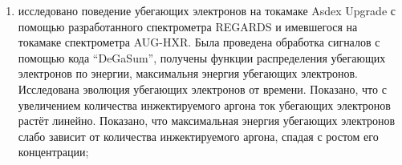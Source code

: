 \begin{enumerate}
  \item исследовано поведение убегающих электронов на токамаке Asdex Upgrade с помощью разработанного спектрометра REGARDS и имевшегося на токамаке спектрометра AUG-HXR. Была проведена обработка сигналов с помощью кода ``DeGaSum'', получены функции распределения убегающих электронов по энергии, максимальня энергия убегающих электронов. Исследована эволюция убегающих электронов от времени. Показано, что с увеличением количества инжектируемого аргона ток убегающих электронов растёт линейно. Показано, что максимальная энергия убегающих электронов слабо зависит от количества инжектируемого аргона, спадая с ростом его концентрации;

\end{enumerate}
